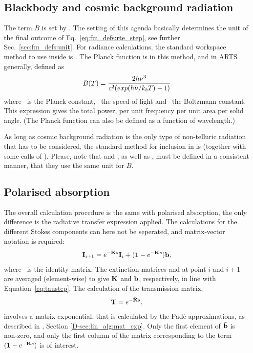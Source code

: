 \subsection{Blackbody and cosmic background radiation}

The term $B$ is set by . The setting of
this agenda basically determines the unit of the final outcome of
Eq.~\ref{eq:fm_defs:rte_step}, see further Sec.~\ref{sec:fm_defs:unit}. For
radiance calculations, the standard workspace method to use inside
 is
. The Planck function is in this method,
and in ARTS generally, defined as
\begin{equation}
  \label{eq:planck}
  B(T) = \frac{2h\nu^3}
                  {c^2(exp(h\nu/k_bT)-1)}
\end{equation}
where \planckCns\ is the Planck constant, \speedoflight\ the speed of light and
\boltzmannCns\ the Boltzmann constant. This expression gives the total power,
per unit frequency per unit area per solid angle. (The Planck function can also
be defined as a function of wavelength.)

As long as cosmic background radiation is the only type of non-telluric
radiation that has to be considered, the standard method for inclusion in
 is  (together with some calls
of ). Please, note that
 and ,
as well as , must be defined in a consistent
manner, that they use the same unit for $B$.


\subsection{Polarised absorption}

The overall calculation procedure is the same with polarised absorption, the
only difference is the radiative transfer expression applied. The calculations
for the different Stokes components can here not be seperated, and
matrix-vector notation is required: 
\begin{equation}
  \label{eq:fm_defs:vrte_step}
  {\bf I}_{i+1} = e^{-\bar{{\bf K}}s} {\bf I}_i + 
                  (\mathbf{1}-e^{-\bar{{\bf K}}s})\bar{\mathbf{b}},
\end{equation}
where \IdnMtr\ is the identity matrix. The extinction matrices and 
at point $i$ and $i+1$ are averaged (element-wise) to give $\bar{{\bf K}}$ and
$\bar{\mathbf{b}}$, respectively, in line with Equation~\ref{eq:taustep}. The
calculation of the transmission matrix,
\begin{equation}
  \mathbf{T} = e^{-\bar{{\bf K}}s},
\end{equation}
involves a matrix exponential, that is calculated by the Pad\'e approximations,
as described in \developer, Section \ref{D-sec:lin_alg:mat_exp}. Only the first
element of $\bar{\mathbf{b}}$ is non-zero, and only the first column of the
matrix corresponding to the term $(\mathbf{1}-e^{-\bar{{\bf K}}s})$ is of interest.





